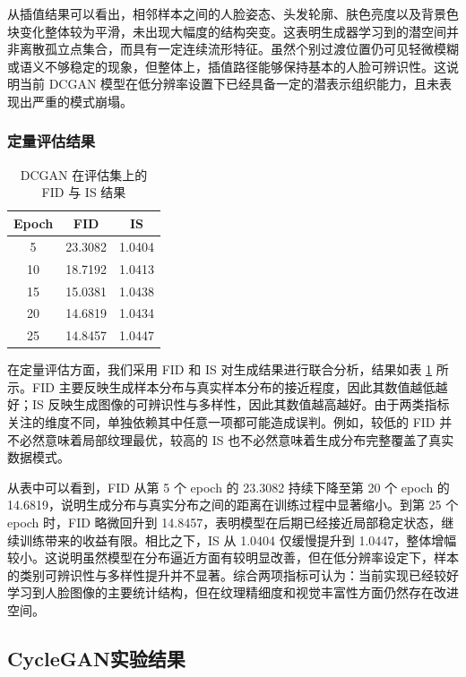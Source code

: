 \documentclass[12pt, a4paper, UTF8]{ctexart}
\begin{document}
从插值结果可以看出，相邻样本之间的人脸姿态、头发轮廓、肤色亮度以及背景色块变化整体较为平滑，未出现大幅度的结构突变。这表明生成器学习到的潜空间并非离散孤立点集合，而具有一定连续流形特征。虽然个别过渡位置仍可见轻微模糊或语义不够稳定的现象，但整体上，插值路径能够保持基本的人脸可辨识性。这说明当前 DCGAN 模型在低分辨率设置下已经具备一定的潜表示组织能力，且未表现出严重的模式崩塌。

\subsubsection{定量评估结果}

\begin{table}[H]
\centering
\caption{DCGAN 在评估集上的 FID 与 IS 结果}
\label{tab:dcgan-metrics}
\begin{tabular}{ccc}
\toprule
Epoch & FID & IS \\
\midrule
5  & 23.3082 & 1.0404 \\
10 & 18.7192 & 1.0413 \\
15 & 15.0381 & 1.0438 \\
20 & 14.6819 & 1.0434 \\
25 & 14.8457 & 1.0447 \\
\bottomrule
\end{tabular}
\end{table}

在定量评估方面，我们采用 FID 和 IS 对生成结果进行联合分析，结果如表 \ref{tab:dcgan-metrics} 所示。FID 主要反映生成样本分布与真实样本分布的接近程度，因此其数值越低越好；IS 反映生成图像的可辨识性与多样性，因此其数值越高越好。由于两类指标关注的维度不同，单独依赖其中任意一项都可能造成误判。例如，较低的 FID 并不必然意味着局部纹理最优，较高的 IS 也不必然意味着生成分布完整覆盖了真实数据模式。

从表中可以看到，FID 从第 5 个 epoch 的 23.3082 持续下降至第 20 个 epoch 的 14.6819，说明生成分布与真实分布之间的距离在训练过程中显著缩小。到第 25 个 epoch 时，FID 略微回升到 14.8457，表明模型在后期已经接近局部稳定状态，继续训练带来的收益有限。相比之下，IS 从 1.0404 仅缓慢提升到 1.0447，整体增幅较小。这说明虽然模型在分布逼近方面有较明显改善，但在低分辨率设定下，样本的类别可辨识性与多样性提升并不显著。综合两项指标可认为：当前实现已经较好学习到人脸图像的主要统计结构，但在纹理精细度和视觉丰富性方面仍然存在改进空间。

\subsection{CycleGAN实验结果}
\end{document}
